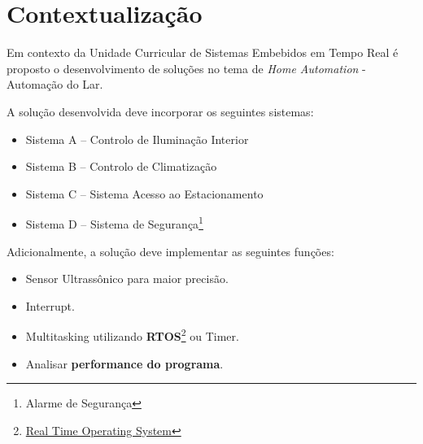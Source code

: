 \chapter*{Contextualização}

Em contexto da Unidade Curricular de Sistemas Embebidos em Tempo Real é proposto o desenvolvimento de soluções no tema de \textit{Home Automation} - Automação do Lar.

A solução desenvolvida deve incorporar os seguintes sistemas:
\begin{itemize}
    \item Sistema A – Controlo de Iluminação Interior
    \item Sistema B – Controlo de Climatização
    \item Sistema C – Sistema Acesso ao Estacionamento
    \item Sistema D – Sistema de Segurança\footnote{Alarme de Segurança}
\end{itemize}

Adicionalmente, a solução deve implementar as seguintes funções:
\begin{itemize}
    \item Sensor Ultrassônico para maior precisão. 
    \item Interrupt.
    \item Multitasking utilizando \textbf{RTOS}\footnote{\href{https://www.arduino.cc/reference/en/libraries/freertos}{Real Time Operating System}} ou Timer.
    \item Analisar \textbf{performance do programa}.
\end{itemize}

